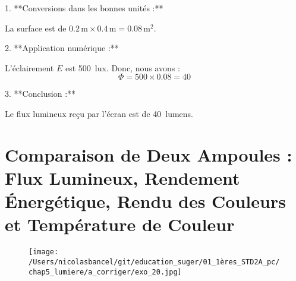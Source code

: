 \documentclass[answers]{exam}
\begin{document}
\begin{solution}
\begin{questions}
1. **Conversions dans les bonnes unités :**

La surface est de \(0.2 \, \text{m} \times 0.4 \, \text{m} = 0.08 \, \text{m}^2\).

2. **Application numérique :**

L'éclairement \(E\) est \SI{500}{lux}. Donc, nous avons :
\[
\Phi = 500 \times 0.08 = 40
\]

3. **Conclusion :**

Le flux lumineux reçu par l'écran est de \SI{40}{lumens}.

\end{questions}
\end{solution}



\section*{Comparaison de Deux Ampoules : Flux Lumineux, Rendement Énergétique, Rendu des Couleurs et Température de Couleur}

    \begin{figure}[H]
      \centering
      \texttt{[image: /Users/nicolasbancel/git/education\_suger/01\_1ères\_STD2A\_pc/chap5\_lumiere/a\_corriger/exo\_20.jpg]}
      \captionsetup{labelformat=empty}
    \end{figure}
\end{document}

